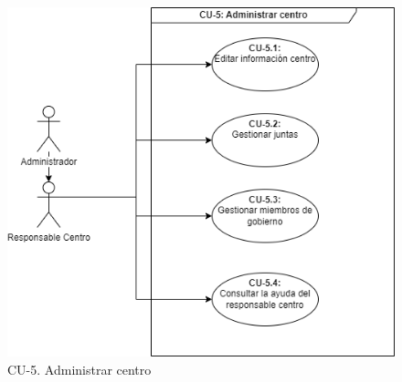\begin{figure}[H]
        \centering
        \includegraphics[scale=0.55]{img/diagramas/Funcional/CU-5.png}
        \caption{CU-5. Administrar centro}
        \label{fig:Diagrama-Caso de uso 5. Administrar centro}
    \end{figure}
    

